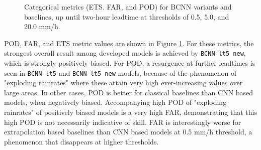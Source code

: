 \begin{figure}[H]
	\caption{Categorical metrics (ETS. FAR, and POD) for BCNN variants and baselines, up until two-hour leadtime at thresholds of 0.5, 5.0, and 20.0 mm/h.}
	\label{fig:cat-metrics}
\end{figure}

POD, FAR, and ETS metric values are shown in Figure \ref{fig:cat-metrics}. For these metrics, the strongest overall result among developed models is achieved by \texttt{BCNN lt5 new}, which is strongly positively biased. 
For POD, a resurgence at further leadtimes is seen in \texttt{BCNN lt5} and \texttt{BCNN lt5 new} models, because of the phenomenon of "exploding rainrates" where these attain very high ever-increasing values over large areas.  In other cases, POD is better for classical baselines than CNN based models, when negatively biased. Accompanying high POD of "exploding rainrates" of positively biased models is a very high FAR, demonstrating that this high POD is not necessarily indicative of skill. FAR is interestingly worse for extrapolation based baselines than CNN based models at 0.5 mm/h threshold, a phenomenon that disappears at higher thresholds.

